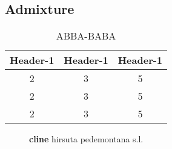 \subsection{Admixture}

\lipsum[1]

\begin{wraptable}{r}{5.5cm}
\begin{tabular}{ccc}\\\toprule  
Header-1 & Header-1 & Header-1 \\\midrule
2 &3 & 5\\  \midrule
2 &3 & 5\\  \midrule
2 &3 & 5\\  \bottomrule
\end{tabular}
\caption{ABBA-BABA}
\label{ABBA}
\end{wraptable}

\lipsum[1] 

\lipsum[2]

\begin{wrapfigure}{r}{0.30\textwidth}
	\vspace{-40pt}
	\begin{center}
	\end{center}
	\vspace{-20pt}
	\caption{\textbf{cline} hirsuta pedemontana s.l.}
    \label{cline}
\end{wrapfigure}

\lipsum[1]

